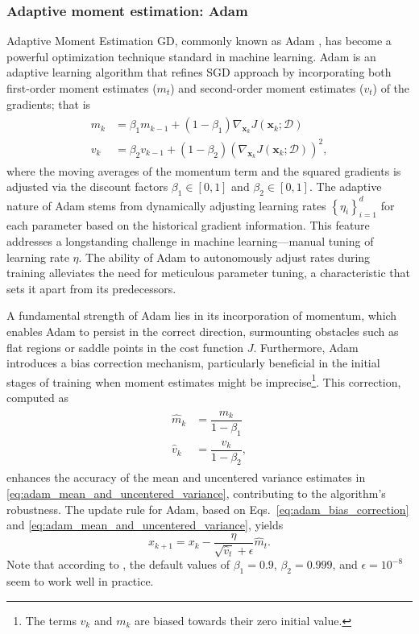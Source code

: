 \subsubsection{Adaptive moment estimation: Adam}
Adaptive Moment Estimation GD, commonly known as Adam \cite{Kingma2014Adammethodstochastic}, has become a powerful optimization technique standard in machine learning. Adam is an adaptive learning algorithm that refines SGD approach by incorporating both first-order moment estimates ($m_t$) and second-order moment estimates ($v_t$) of the gradients; that is
\begin{align}\label{eq:adam_mean_and_uncentered_variance}
	\begin{split} 
		m_k &= \beta_1 m_{k-1} + \left(1 - \beta_1 \right) \nabla_{\bm{x}_k} J(\bm{x}_k;\mathcal{D}) \\ 
		v_k &= \beta_2 v_{k-1} + \left(1 - \beta_2\right) \left( \nabla_{\bm{x}_k} J(\bm{x}_k;\mathcal{D}) \right)^2 ,
	\end{split}
\end{align}
where the moving averages of the momentum term and the squared gradients  is adjusted via the discount factors $\beta_1 \in [0,1]$ and $\beta_2 \in [0,1]$. The adaptive nature of Adam stems from dynamically adjusting learning rates $\left\lbrace \eta_i\right\rbrace^d_{i=1}$ for each parameter based on the historical gradient information. This feature addresses a longstanding challenge in machine learning---manual tuning of learning rate $\eta$. The ability of Adam to autonomously adjust rates during training alleviates the need for meticulous parameter tuning, a characteristic that sets it apart from its predecessors.

A fundamental strength of Adam lies in its incorporation of momentum, which enables Adam to persist in the correct direction, surmounting obstacles such as flat regions or saddle points in the cost function $J$. Furthermore, Adam introduces a bias correction mechanism, particularly beneficial in the initial stages of training when moment estimates might be imprecise\footnote{The terms $v_k$ and $m_k$ are biased towards their zero initial value.}. This correction, computed as
\begin{align}\label{eq:adam_bias_correction}
	\begin{split} 
		\hat{m}_k &= \dfrac{m_k}{1 - \beta_1} \\ 
		\hat{v}_k &= \dfrac{v_k}{1 - \beta_2},
	\end{split} 
\end{align}
enhances the accuracy of the mean and uncentered variance estimates in \eqref{eq:adam_mean_and_uncentered_variance}, contributing to the algorithm's robustness. The update rule for Adam, based on Eqs.~\eqref{eq:adam_bias_correction} and \eqref{eq:adam_mean_and_uncentered_variance}, yields
\begin{equation}
	x_{k+1} = x_{k} - \dfrac{\eta}{\sqrt{\hat{v}_t} + \epsilon} \hat{m}_t.
\end{equation}
Note that according to \cite{Kingma2014Adammethodstochastic}, the default values of $\beta_1 = 0.9$, $ \beta_2 = 0.999 $, and $\epsilon =10^{-8}$ seem to work well in practice.

